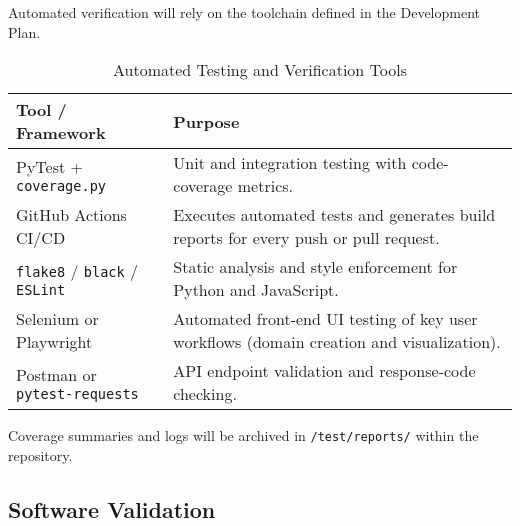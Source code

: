 \documentclass[12pt, titlepage]{article}
\renewcommand{\arraystretch}{1.15}
\begin{document}

Automated verification will rely on the toolchain defined in the Development
Plan.

\begin{table}[H]
\centering
\caption{Automated Testing and Verification Tools}
\setlength{\tabcolsep}{6pt}
\renewcommand{\arraystretch}{1.2}
\footnotesize

\begin{tabularx}{\textwidth}{l X}
\toprule
\textbf{Tool / Framework} & \textbf{Purpose} \\
\midrule
\arrayrulecolor[gray]{0.8}
PyTest + \texttt{coverage.py} &
Unit and integration testing with code-coverage metrics. \\
\hline
GitHub Actions CI/CD &
Executes automated tests and generates build reports for every push or pull
request. \\
\hline
\texttt{flake8} / \texttt{black} / \texttt{ESLint} &
Static analysis and style enforcement for Python and JavaScript. \\
\hline
Selenium or Playwright &
Automated front-end UI testing of key user workflows (domain creation and
visualization). \\
\hline
Postman or \texttt{pytest-requests} &
API endpoint validation and response-code checking. \\
\bottomrule
\end{tabularx}
\end{table}

Coverage summaries and logs will be archived in \texttt{/test/reports/} within
the repository.

\subsection{Software Validation}
\label{subsec:software-validation}



\end{document}
